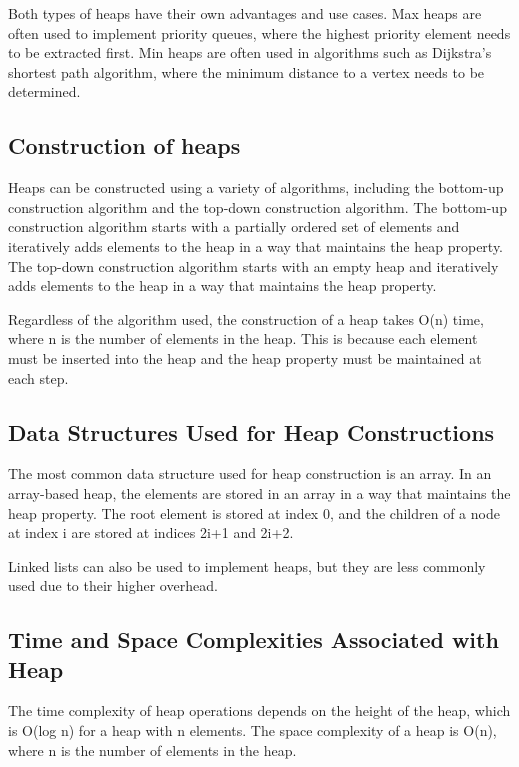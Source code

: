 \documentclass[11pt]{article}
\begin{document}
Both types of heaps have their own advantages and use cases. Max heaps are often used to implement priority queues, where the highest priority element needs to be extracted first. Min heaps are often used in algorithms such as Dijkstra's shortest path algorithm, where the minimum distance to a vertex needs to be determined.

\subsection{Construction of heaps}

Heaps can be constructed using a variety of algorithms, including the bottom-up construction algorithm and the top-down construction algorithm. The bottom-up construction algorithm starts with a partially ordered set of elements and iteratively adds elements to the heap in a way that maintains the heap property. The top-down construction algorithm starts with an empty heap and iteratively adds elements to the heap in a way that maintains the heap property.

Regardless of the algorithm used, the construction of a heap takes O(n) time, where n is the number of elements in the heap. This is because each element must be inserted into the heap and the heap property must be maintained at each step.

\subsection{Data Structures Used for Heap Constructions}

The most common data structure used for heap construction is an array. In an array-based heap, the elements are stored in an array in a way that maintains the heap property. The root element is stored at index 0, and the children of a node at index i are stored at indices 2i+1 and 2i+2.

Linked lists can also be used to implement heaps, but they are less commonly used due to their higher overhead.

\subsection{Time and Space Complexities Associated with Heap}

The time complexity of heap operations depends on the height of the heap, which is O(log n) for a heap with n elements. The space complexity of a heap is O(n), where n is the number of elements in the heap.
\end{document}
